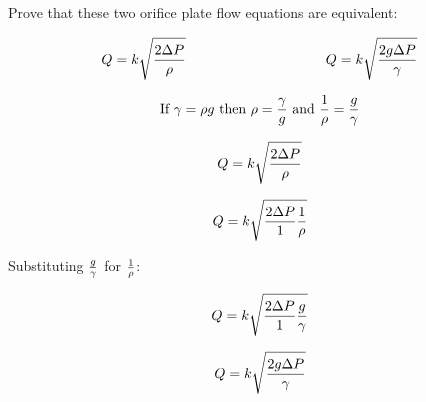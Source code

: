 

Prove that these two orifice plate flow equations are equivalent:

$$Q = k \sqrt{{2 \Delta P \over \rho}} \hbox{\hskip 100pt}  Q = k \sqrt{{2 g \Delta P \over \gamma}}$$







$$\hbox{If }\gamma = \rho g \hbox{ then } \rho = {\gamma \over g} \hbox{ and } {1 \over \rho} = {g \over \gamma}$$

$$Q = k \sqrt{{2 \Delta P \over \rho}}$$ 

$$Q = k \sqrt{{2 \Delta P \over 1}  {1 \over \rho}}$$ 

Substituting $g \over \gamma$ for $1 \over \rho$:

$$Q = k \sqrt{{2 \Delta P \over 1}  {g \over \gamma}}$$ 

$$Q = k \sqrt{{2 g \Delta P \over \gamma}}$$











